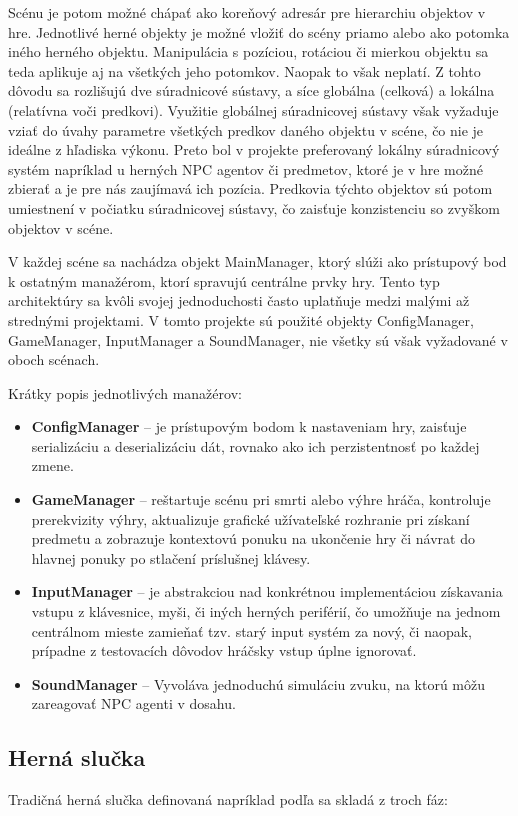 \documentclass[slovak, master]{diploma}
\begin{document}
Scénu je potom možné chápať ako koreňový adresár pre hierarchiu objektov v hre. Jednotlivé herné objekty je možné vložiť do scény priamo alebo ako potomka iného herného objektu. Manipulácia s pozíciou, rotáciou či mierkou objektu sa teda aplikuje aj na všetkých jeho potomkov. Naopak to však neplatí. Z tohto dôvodu sa rozlišujú dve súradnicové sústavy, a síce globálna (celková) a lokálna (relatívna voči predkovi). Využitie globálnej súradnicovej sústavy však vyžaduje vziať do úvahy parametre všetkých predkov daného objektu v scéne, čo nie je ideálne z hľadiska výkonu. Preto bol v projekte preferovaný lokálny súradnicový systém napríklad u herných NPC agentov či predmetov, ktoré je v hre možné zbierať a je pre nás zaujímavá ich pozícia. Predkovia týchto objektov sú potom umiestnení v počiatku súradnicovej sústavy, čo zaisťuje konzistenciu so zvyškom objektov v scéne.

V každej scéne sa nachádza objekt MainManager, ktorý slúži ako prístupový bod k ostatným manažérom, ktorí spravujú centrálne prvky hry. Tento typ architektúry sa kvôli svojej jednoduchosti často uplatňuje medzi malými až strednými projektami. V tomto projekte sú použité objekty ConfigManager, GameManager, InputManager a SoundManager, nie všetky sú však vyžadované v oboch scénach. 

Krátky popis jednotlivých manažérov:
\begin{itemize}
  \item \textbf{ConfigManager} -- je prístupovým bodom k nastaveniam hry, zaisťuje serializáciu a deserializáciu dát, rovnako ako ich perzistentnosť po každej zmene.
  \item \textbf{GameManager} -- reštartuje scénu pri smrti alebo výhre hráča, kontroluje prerekvizity výhry, aktualizuje grafické užívateľské rozhranie pri získaní predmetu a zobrazuje kontextovú ponuku na ukončenie hry či návrat do hlavnej ponuky po stlačení príslušnej klávesy.
  \item \textbf{InputManager} -- je abstrakciou nad konkrétnou implementáciou získavania vstupu z klávesnice, myši, či iných herných periférií, čo umožňuje na jednom centrálnom mieste zamieňať tzv. starý input systém za nový, či naopak, prípadne z testovacích dôvodov hráčsky vstup úplne ignorovať. 
  \item \textbf{SoundManager} -- Vyvoláva jednoduchú simuláciu zvuku, na ktorú môžu zareagovať NPC agenti v dosahu.
\end{itemize}

\subsection{Herná slučka}
\label{sec:GameLoop}
Tradičná herná slučka definovaná napríklad podľa \cite{GameAlgorithms} sa skladá z troch fáz:
\end{document}
